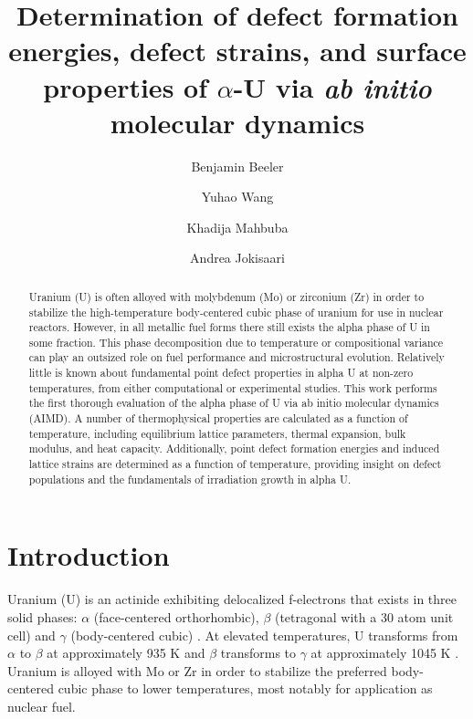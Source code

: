 \documentclass[review]{elsarticle}
\begin{document}
\begin{frontmatter}
\title{Determination of defect formation energies, defect strains, and surface properties of $\alpha$-U via \textit{ab initio} molecular dynamics}

\author[ncsu,inl]{Benjamin Beeler}
\author[mich]{Yuhao Wang}
\author[ncsu]{Khadija Mahbuba}
\author[inl]{Andrea Jokisaari}
\address[ncsu]{North Carolina State University, Raleigh, NC 27607}
\address[inl]{Idaho National Laboratory, Idaho Falls, ID 83415}
\address[mich]{University of Michigan, Ann Arbor, MI 48109}

\begin{abstract}

Uranium (U) is often alloyed with molybdenum (Mo) or zirconium (Zr) in order to stabilize the high-temperature body-centered cubic phase of uranium for use in nuclear reactors. However, in all metallic fuel forms there still exists the alpha phase of U in some fraction. This phase decomposition due to temperature or compositional variance can play an outsized role on fuel performance and microstructural evolution. Relatively little is known about fundamental point defect properties in alpha U at non-zero temperatures, from either computational or experimental studies. This work performs the first thorough evaluation of the alpha phase of U via ab initio molecular dynamics (AIMD). A number of thermophysical properties are calculated as a function of temperature, including equilibrium lattice parameters, thermal expansion, bulk modulus, and heat capacity. Additionally, point defect formation energies and induced lattice strains are determined as a function of temperature, providing insight on defect populations and the fundamentals of irradiation growth in alpha U.

\end{abstract}
\end{frontmatter}

\section{Introduction}

Uranium (U) is an actinide exhibiting delocalized f-electrons that exists in three solid phases: $\alpha$ (face-centered orthorhombic), $\beta$ (tetragonal with a 30 atom unit cell) and $\gamma$ (body-centered cubic) \cite{yoo1998}. At elevated temperatures, U transforms from $\alpha$ to $\beta$ at approximately 935 K and $\beta$ transforms to $\gamma$ at approximately 1045 K \cite{soderlind1998}. Uranium is alloyed with Mo or Zr in order to stabilize the preferred body-centered cubic phase to lower temperatures, most notably for application as nuclear fuel. 
\end{document}
